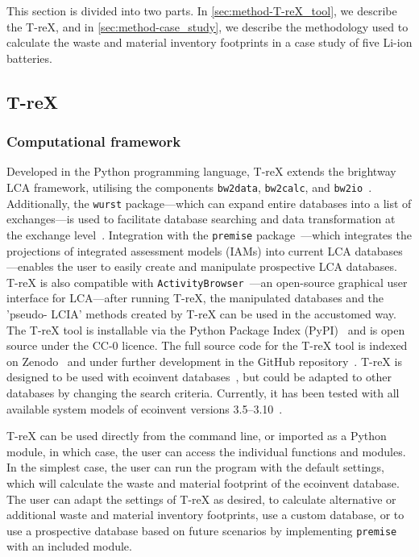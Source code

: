 This section is divided into two parts. In \autoref{sec:method-T-reX_tool}, we describe the T-reX, and in \autoref{sec:method-case_study}, we describe the methodology used to calculate the waste and material inventory footprints in a case study of five Li-ion batteries.

\subsection{T-reX}\label{sec:method-T-reX_tool}

\subsubsection{Computational framework}

Developed in the Python programming language, T-reX extends the brightway LCA framework, utilising the components \texttt{bw2data}, \texttt{bw2calc}, and \texttt{bw2io}~\citep{mutel2017brightway}. Additionally, the \texttt{wurst} package---which can expand entire databases into a list of exchanges---is used to facilitate database searching and data transformation at the exchange level~\citep{mutel2017wurst}. Integration with the \texttt{premise} package~\citep{sacchi2022premise}---which integrates the projections of integrated assessment models (IAMs) into current LCA databases---enables the user to easily create and manipulate prospective LCA databases. T-reX is also compatible with \texttt{ActivityBrowser}~\citep{steubing2020activitybrowser}---an open-source graphical user interface for LCA---after running T-reX, the manipulated databases and the 'pseudo- LCIA' methods created by T-reX can be used in the accustomed way. The T-reX tool is installable via the Python Package Index (PyPI)~\citep{mcdowall2023T-reXpipy} and is open source under the CC-0 licence. The full source code for the T-reX tool is indexed on Zenodo~\citep{mcdowall2023T-reXzenodo} and under further development in the GitHub repository~\citep{mcdowall2024T-reXgithub}. T-reX is designed to be used with ecoinvent databases~\citep{ecoinvent2016version3}, but could be adapted to other databases by changing the search criteria. Currently, it has been tested with all available system models of ecoinvent versions 3.5--3.10~\citep{ecoinvent2016version3}.

T-reX can be used directly from the command line, or imported as a Python module, in which case, the user can access the individual functions and modules. In the simplest case, the user can run the program with the default settings, which will calculate the waste and material footprint of the ecoinvent database. The user can adapt the settings of T-reX as desired, to calculate alternative or additional waste and material inventory footprints, use a custom database, or to use a prospective database based on future scenarios by implementing \texttt{premise} with an included module.

